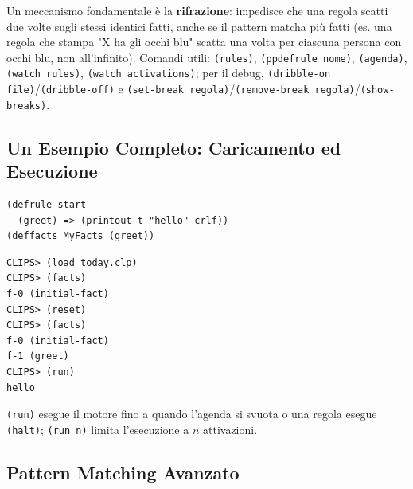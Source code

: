\documentclass[a4paper,11pt]{article}
\begin{document}
Un meccanismo fondamentale è la \textbf{rifrazione}: impedisce che una regola scatti due volte sugli stessi identici fatti, anche se il pattern matcha più fatti (es. una regola che stampa "X ha gli occhi blu" scatta una volta per ciascuna persona con occhi blu, non all'infinito). Comandi utili: \texttt{(rules)}, \texttt{(ppdefrule nome)}, \texttt{(agenda)}, \texttt{(watch rules)}, \texttt{(watch activations)}; per il debug, \texttt{(dribble-on file)}/\texttt{(dribble-off)} e \texttt{(set-break regola)}/\texttt{(remove-break regola)}/\texttt{(show-breaks)}.

\subsection{Un Esempio Completo: Caricamento ed Esecuzione}

\begin{lstlisting}
(defrule start
  (greet) => (printout t "hello" crlf))
(deffacts MyFacts (greet))
\end{lstlisting}
\begin{lstlisting}
CLIPS> (load today.clp)
CLIPS> (facts)
f-0 (initial-fact)
CLIPS> (reset)
CLIPS> (facts)
f-0 (initial-fact)
f-1 (greet)
CLIPS> (run)
hello
\end{lstlisting}
\texttt{(run)} esegue il motore fino a quando l'agenda si svuota o una regola esegue \texttt{(halt)}; \texttt{(run n)} limita l'esecuzione a $n$ attivazioni.

\subsection{Pattern Matching Avanzato}
\end{document}

